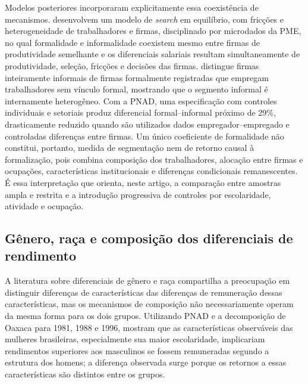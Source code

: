 \documentclass[12pt,a4paper]{article}
\begin{document}
Modelos posteriores incorporaram explicitamente essa coexistência de mecanismos.
\citet{meghir2015} desenvolvem um modelo de \textit{search} em equilíbrio, com fricções e
heterogeneidade de trabalhadores e firmas, disciplinado por microdados da PME, no qual
formalidade e informalidade coexistem mesmo entre firmas de produtividade semelhante e os
diferenciais salariais resultam simultaneamente de produtividade, seleção, fricções e
decisões das firmas. \citet{ulyssea2018} distingue firmas inteiramente informais de firmas
formalmente registradas que empregam trabalhadores sem vínculo formal, mostrando que o
segmento informal é internamente heterogêneo. Com a PNAD, uma especificação com controles
individuais e setoriais produz diferencial formal–informal próximo de 29\%, drasticamente
reduzido quando são utilizados dados empregador–empregado e controladas diferenças entre
firmas. Um único coeficiente de formalidade não constitui, portanto, medida de segmentação
nem de retorno causal à formalização, pois combina composição dos trabalhadores, alocação
entre firmas e ocupações, características institucionais e diferenças condicionais
remanescentes. É essa interpretação que orienta, neste artigo, a comparação entre amostras
ampla e restrita e a introdução progressiva de controles por escolaridade, atividade e
ocupação.

\subsection{Gênero, raça e composição dos diferenciais de rendimento}

A literatura sobre diferenciais de gênero e raça compartilha a preocupação em distinguir
diferenças de características das diferenças de remuneração dessas características, mas
os mecanismos de composição não necessariamente operam da mesma forma para os dois grupos.
Utilizando PNAD e a decomposição de Oaxaca para 1981, 1988 e 1996, \citet{giuberti2005}
mostram que as características observáveis das mulheres brasileiras, especialmente sua
maior escolaridade, implicariam rendimentos superiores aos masculinos se fossem
remuneradas segundo a estrutura dos homens; a diferença observada surge porque os retornos
a essas características são distintos entre os grupos.
\end{document}

